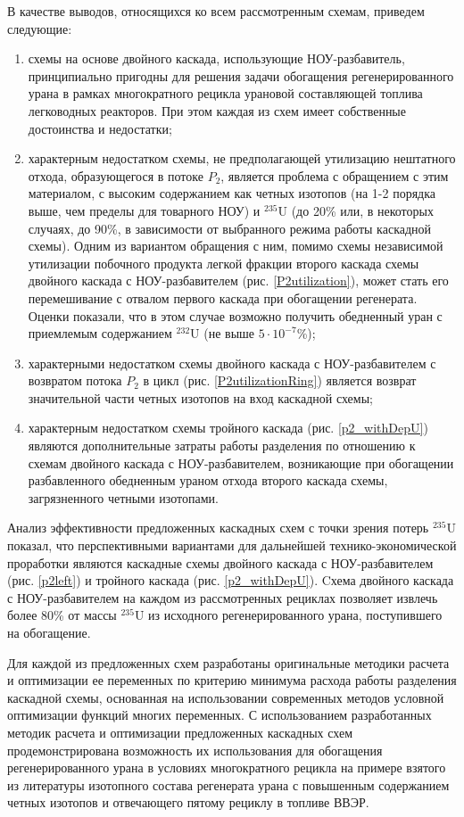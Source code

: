 В качестве выводов, относящихся ко всем рассмотренным схемам, приведем следующие:
\begin{enumerate}
    \item схемы на основе двойного каскада, использующие НОУ-разбавитель, принципиально пригодны для решения задачи обогащения регенерированного урана в рамках многократного рецикла урановой составляющей топлива легководных реакторов. При этом каждая из схем имеет собственные достоинства и недостатки;
    \item характерным недостатком схемы, не предполагающей утилизацию нештатного отхода, образующегося в потоке $P_2$, является проблема с обращением с этим материалом, с высоким содержанием как четных изотопов (на 1-2 порядка выше, чем пределы для товарного НОУ) и $^{235}$U (до 20\% или, в некоторых случаях, до 90\%, в зависимости от выбранного режима работы каскадной схемы). Одним из вариантом обращения с ним, помимо схемы независимой утилизации побочного продукта легкой фракции второго каскада схемы двойного каскада с НОУ-разбавителем (рис. \ref{P2utilization}), может стать его перемешивание с отвалом первого каскада при обогащении регенерата. Оценки показали, что в этом случае возможно получить обедненный уран с приемлемым содержанием $^{232}$U (не выше $5\cdot10^{-7}$\%);
    \item характерными недостатком схемы двойного каскада с НОУ-разбавителем с возвратом потока $P_2$ в цикл (рис. \ref{P2utilizationRing}) является возврат значительной части четных изотопов на вход каскадной схемы;
    \item характерным недостатком схемы тройного каскада (рис. \ref{p2_withDepU}) являются дополнительные затраты работы разделения по отношению к схемам двойного каскада с НОУ-разбавителем, возникающие при обогащении разбавленного обедненным ураном отхода второго каскада схемы, загрязненного четными изотопами.
  \end{enumerate}

Анализ эффективности предложенных каскадных схем с точки зрения потерь $^{235}$U показал, что перспективными вариантами для дальнейшей технико-экономической проработки являются каскадные схемы двойного каскада с НОУ-разбавителем (рис. \ref{p2left}) и тройного каскада (рис. \ref{p2_withDepU}). Cхема двойного каскада с НОУ-разбавителем на каждом из рассмотренных рециклах позволяет извлечь более 80\% от массы $^{235}$U из исходного регенерированного урана, поступившего на обогащение.

Для каждой из предложенных схем разработаны оригинальные методики расчета и оптимизации ее переменных по критерию минимума расхода работы разделения каскадной схемы, основанная на использовании современных методов условной оптимизации функций многих переменных. С использованием разработанных методик расчета и оптимизации предложенных каскадных схем продемонстрирована возможность их использования для обогащения регенерированного урана в условиях многократного рецикла на примере взятого из литературы изотопного состава регенерата урана с повышенным содержанием четных изотопов и отвечающего пятому рециклу в топливе ВВЭР.

